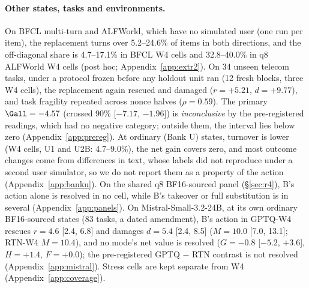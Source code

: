 \paragraph{Other states, tasks and environments.} On BFCL multi-turn and ALFWorld, which have no simulated user (one run per item), the replacement turns over 5.2--24.6\% of items in both directions, and the off-diagonal share is 4.7--17.1\% in BFCL W4 cells and 32.8--40.0\% in q8 ALFWorld W4 cells (post hoc; Appendix~\ref{app:extr2}). %
On 34 unseen telecom tasks, under a protocol frozen before any holdout unit ran (12 fresh blocks, three W4 cells), the replacement again rescued and damaged ($r=+5.21$, $d=+9.77$\pp{}), and task fragility repeated across nonce halves ($\rho=0.59$). The primary $\Gall=-4.57$\pp{} (crossed 90\% [$-7.17$, $-1.96$]) is \emph{inconclusive} by the pre-registered readings, which had no negative category; outside them, the interval lies below zero (Appendix~\ref{app:prereg}). %
At ordinary (Bank U) states, turnover is lower (W4 cells, U1 and U2B: 4.7--9.0\%), the net gain covers zero, and most outcome changes come from differences in text, whose labels did not reproduce under a second user simulator, so we do not report them as a property of the action (Appendix~\ref{app:banku}). %
On the shared q8 BF16-sourced panel (\S\ref{sec:r4}), B's action alone is resolved in no cell, while B's takeover or full substitution is in several (Appendix~\ref{app:panels}). %
On Mistral-Small-3.2-24B, at its own ordinary BF16-sourced states (83 tasks, a dated amendment), B's action in GPTQ-W4 rescues $r=4.6$ [2.4, 6.8] and damages $d=5.4$ [2.4, 8.5]\pp{} ($M=10.0$ [7.0, 13.1]; RTN-W4 $M=10.4$), and no mode's net value is resolved ($G=-0.8$ [$-5.2$, $+3.6$], $H=+1.4$, $F=+0.0$); the pre-registered GPTQ $-$ RTN contrast is not resolved (Appendix~\ref{app:mistral}). %
Stress cells are kept separate from W4 (Appendix~\ref{app:coverage}).


